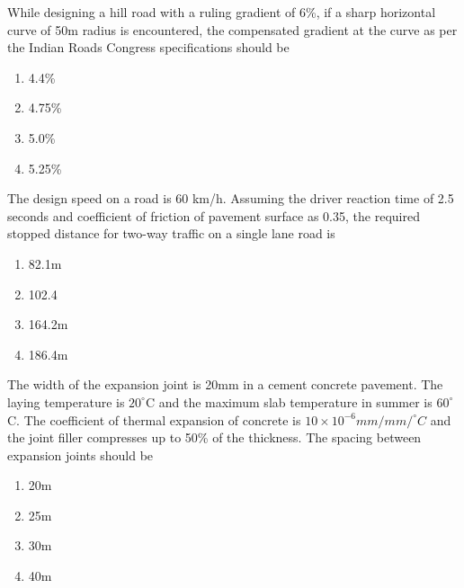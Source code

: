     \item{
            While designing a hill road with a ruling gradient of 6\%, if a sharp horizontal curve of 50m radius is encountered, the compensated gradient at the curve as per the Indian Roads Congress specifications should be
             \hfill
                
            \begin{multicols}{4}
                \begin{enumerate}
                	\item 4.4\%
                	\item 4.75\%
                	\item 5.0\%
                	\item 5.25\%
                \end{enumerate}
            \end{multicols}
        
        }
    \item{
            The design speed on a road is 60 km/h. Assuming the driver reaction time of 2.5 seconds and coefficient of friction of pavement surface as 0.35, the required stopped distance for two-way traffic on a single lane road is 
             \hfill
                
			\begin{multicols}{4}
				\begin{enumerate}
					\item 82.1m
					\item 102.4
					\item 164.2m
					\item 186.4m
				\end{enumerate}
			\end{multicols}
        
        }
    \item{
        
           	The width of the expansion joint is 20mm in a cement concrete pavement. The laying temperature is $20^{\circ}$C and the maximum slab temperature in summer is $60^{\circ}$C. The coefficient of thermal expansion of concrete is $10 \times 10^{-6} mm/mm/^{\circ}C$ and the joint filler compresses up to 50\% of the thickness. The spacing between expansion joints should be
             \text{   }\hfill
                
            \begin{multicols}{4}
                \begin{enumerate}
                	\item 20m
                	\item 25m
                	\item 30m
                	\item 40m
                \end{enumerate}
            \end{multicols}
        
        }
